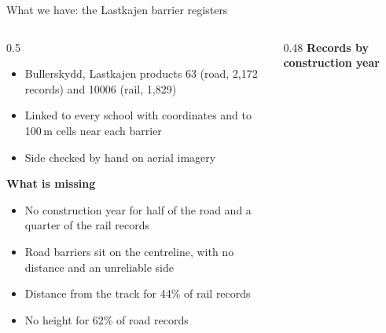 \documentclass[aspectratio=169, 10pt]{beamer}
\begin{document}
\begin{frame}{What we have: the Lastkajen barrier registers}
\begin{columns}[c]
\begin{column}{0.5\textwidth}
\small
\begin{itemize}\setlength{\itemsep}{0pt}
  \item Bullerskydd, Lastkajen products 63 (road, 2,172 records) and 10006 (rail, 1,829)
  \item Linked to every school with coordinates and to 100\,m cells near each barrier
  \item Side checked by hand on aerial imagery
\end{itemize}

\smallskip
\textbf{What is missing}
\begin{itemize}\setlength{\itemsep}{0pt}
  \item No construction year for half of the road and a quarter of the rail records
  \item Road barriers sit on the centreline, with no distance and an unreliable side
  \item Distance from the track for 44\% of rail records
  \item No height for 62\% of road records
\end{itemize}
\end{column}
\begin{column}{0.48\textwidth}
\centering
\textbf{Records by construction year}\\[0.3em]
\end{column}
\end{columns}
\end{frame}
\end{document}
